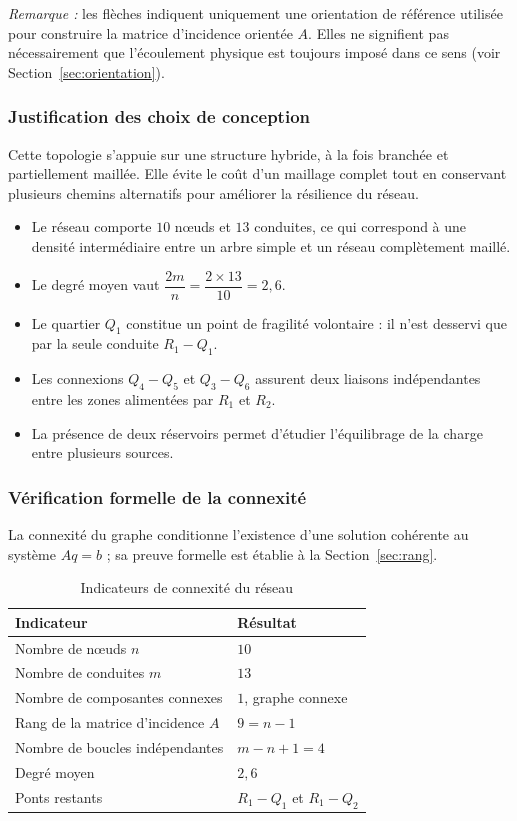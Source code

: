 \documentclass[11pt]{ama-article}
\begin{document}
\emph{Remarque : } les flèches indiquent uniquement une orientation de référence utilisée pour
construire la matrice d'incidence orientée $A$. Elles ne signifient pas nécessairement que
l'écoulement physique est toujours imposé dans ce sens (voir Section~\ref{sec:orientation}).

\subsubsection{Justification des choix de conception}

Cette topologie s'appuie sur une structure hybride, à la fois branchée et partiellement
maillée. Elle évite le coût d'un maillage complet tout en conservant plusieurs chemins
alternatifs pour améliorer la résilience du réseau.

\begin{itemize}[leftmargin=*]
    \item Le réseau comporte $10$ nœuds et $13$ conduites, ce qui correspond à une densité
    intermédiaire entre un arbre simple et un réseau complètement maillé.
    \item Le degré moyen vaut $\dfrac{2m}{n} = \dfrac{2\times 13}{10} = 2{,}6$.
    \item Le quartier $Q_1$ constitue un point de fragilité volontaire : il n'est desservi que
    par la seule conduite $R_1\!-\!Q_1$.
    \item Les connexions $Q_4\!-\!Q_5$ et $Q_3\!-\!Q_6$ assurent deux liaisons indépendantes
    entre les zones alimentées par $R_1$ et $R_2$.
    \item La présence de deux réservoirs permet d'étudier l'équilibrage de la charge entre
    plusieurs sources.
\end{itemize}

\subsubsection{Vérification formelle de la connexité}

La connexité du graphe conditionne l'existence d'une solution cohérente au système $Aq=b$ ; sa
preuve formelle est établie à la Section~\ref{sec:rang}.

\begin{table}[h!]
\centering
\begin{tabular}{>{\raggedright\arraybackslash}p{7.5cm}>{\raggedright\arraybackslash}p{6cm}}
\toprule
\textbf{Indicateur} & \textbf{Résultat} \\
\midrule
Nombre de nœuds $n$ & $10$ \\
Nombre de conduites $m$ & $13$ \\
Nombre de composantes connexes & $1$, graphe connexe \\
Rang de la matrice d'incidence $A$ & $9 = n-1$ \\
Nombre de boucles indépendantes & $m-n+1 = 4$ \\
Degré moyen & $2{,}6$ \\
Ponts restants & $R_1\!-\!Q_1$ et $R_1\!-\!Q_2$ \\
\bottomrule
\end{tabular}
\caption{Indicateurs de connexité du réseau}
\end{table}
\end{document}
